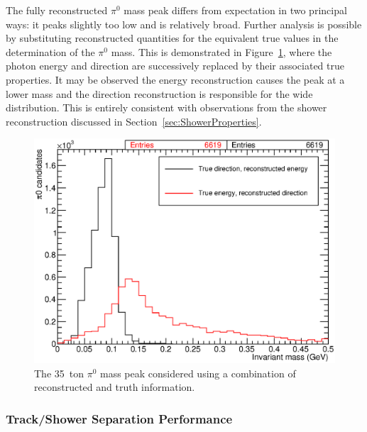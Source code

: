 The fully reconstructed $\pi^0$ mass peak differs from expectation in two principal ways: it peaks slightly too low and is relatively broad.  Further analysis is possible by substituting reconstructed quantities for the equivalent true values in the determination of the $\pi^0$ mass.  This is demonstrated in Figure~\ref{fig:Pi0MassPeakTruth}, where the photon energy and direction are successively replaced by their associated true properties.  It may be observed the energy reconstruction causes the peak at a lower mass and the direction reconstruction is responsible for the wide distribution.  This is entirely consistent with observations from the shower reconstruction discussed in Section~\ref{sec:ShowerProperties}.

\begin{figure}
  \centering
  \includegraphics[width=12cm]{Pi0MassPeakTruth.eps}
  \caption[The 35~ton $\pi^0$ mass peak considered using a combination of reconstructed and truth information.]{The 35~ton $\pi^0$ mass peak considered using a combination of reconstructed and truth information.}
  \label{fig:Pi0MassPeakTruth}
\end{figure}

\subsubsection{Track/Shower Separation Performance}\label{sec:TrackShowerPerformance}

